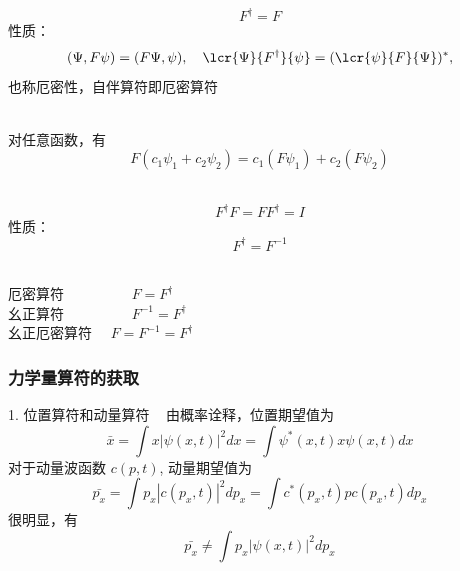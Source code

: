 \begin{frame} 
    \begin{definition}[自伴算符] 
        $$ F^{\dagger} = F $$
        性质：
        $$ (\Psi,F\psi)=(F\Psi,\psi), \quad \lcr{\Psi}{F^\dagger}{\psi}=(\lcr{\psi}{F}{\Psi})^*, $$ 
        也称厄密性，{\color{red}自伴算符即厄密算符}
    \end{definition} 
    \begin{definition}[线性算符]
    ~~\\
    对任意函数，有\\
        $$F(c_1\psi_1+c_2\psi_2 ) = c_1(F\psi_1)+c_2(F\psi_2 )$$
    \end{definition}
\end{frame} 

\begin{frame}
    \begin{definition}[幺正(酉)算符] 
        $$ F^{\dagger}F = FF^{\dagger}=I $$
        性质：
        $$ F^{\dagger}=F^{-1}$$ 
    \end{definition}     
    \Tips ~\\   
    厄密算符~~~~~~~~~ $ F=F^{\dagger}$  \\
    幺正算符~~~~~~~~~ $ F^{-1}=F^{\dagger}$  \\
    幺正厄密算符~~ $ F=F^{-1}=F^{\dagger}$  \\
\end{frame} 

\begin{frame} 
    \frametitle{力学量算符的获取}
    1. 位置算符和动量算符
    \解~ 由概率诠释，位置期望值为
    \begin{equation*}
        \bar{x}=\int x|\psi(x, t)|^{2} d x=\int \psi^{*}(x, t) x \psi(x, t) d x
    \end{equation*}
    对于动量波函数 $c(p,t)$, 动量期望值为
    \begin{equation*}
        \bar{p_x}=\int p_x|c(p_x, t)|^{2} d p_x=\int c^{*}(p_x, t) p c(p_x, t) d p_x
    \end{equation*}
    很明显，有
    \begin{equation*}
        \bar{p_x}\neq\int p_x|\psi(x, t)|^{2} d p_x
    \end{equation*}
\end{frame} 

